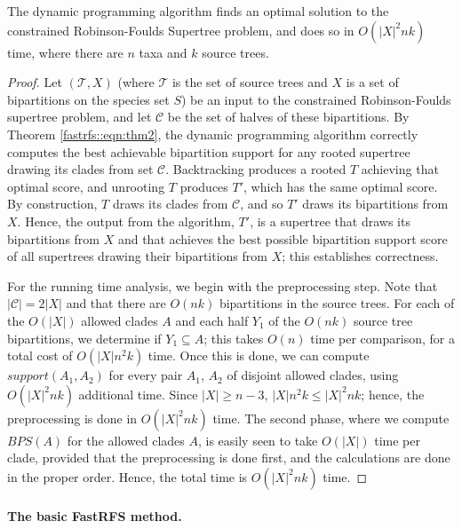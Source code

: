 \begin{theorem}
The dynamic programming algorithm finds an optimal solution
to the constrained Robinson-Foulds Supertree problem,
and does so in $O(|X|^2 nk)$ time, where there
are $n$ taxa and $k$ source trees.
\label{fastrfs::thm:main}
\end{theorem}
\begin{proof}
Let
$(\mathcal{T},X)$ (where $\mathcal{T}$ is the
set of source trees and $X$ is a set of bipartitions
on the species set $S$)
be an input 
to the constrained Robinson-Foulds supertree
problem, and let $\mathcal{C}$ be the set of
halves of these bipartitions.
By Theorem \ref{fastrfs::eqn:thm2}, 
the dynamic programming
algorithm correctly computes the  best
achievable bipartition support for any
rooted
supertree  drawing its clades
from set $\mathcal{C}$.
Backtracking produces a
rooted $T$ achieving that optimal score, and unrooting
$T$
produces $T'$, which has the same optimal score.
By construction, $T$ draws its clades from
$\mathcal{C}$, 
 and so $T'$ draws its bipartitions
from $X$.
Hence, the output from the
algorithm, $T'$, is a supertree
that
draws its bipartitions from $X$ and 
that
achieves the best possible bipartition
support score of all
supertrees drawing their bipartitions from $X$;
this establishes correctness.


For the running time analysis, we begin with the
preprocessing step. Note that
$|\mathcal{C}|=2|X|$ and that there
are $O(nk)$
bipartitions in the
source trees.
For each of the $O(|X|)$ allowed clades $A$ and
each half $Y_1$ of the $O(nk)$  source tree bipartitions, we
determine if $Y_1 \subseteq A$;
this takes $O(n)$ time per comparison, for a total cost of $O(|X|n^2k)$ time. 
Once this is done, we can compute $support(A_1,A_2)$ for
every pair $A_1$, $A_2$ of disjoint
allowed clades, using $O(|X|^2nk)$ additional time. 
Since $|X|\geq n-3$, 
$|X|n^2k \leq |X|^2 nk$; hence,
the preprocessing is done in $O(|X|^2 nk)$ time.
The second phase, where we compute
$BPS(A)$ for the  allowed clades $A$, is easily seen to take $O(|X|)$ time
per clade, provided that the preprocessing is done first, and
the calculations are done in the proper order.
Hence, the total time is
$O(|X|^2 nk)$ time. 
\end{proof}

\paragraph{\bf The basic FastRFS method.  }

